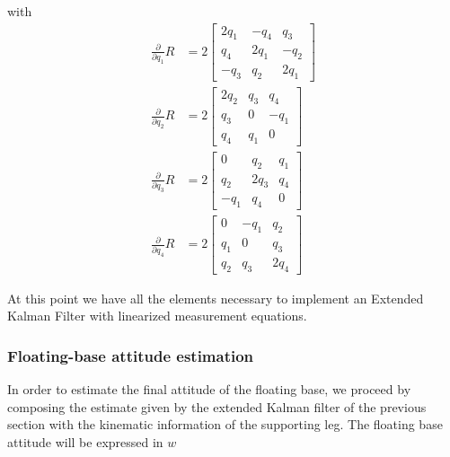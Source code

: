 \documentclass[12pt,a4paper,twoside]{article}
\begin{document}
  with
  \begin{align}
   \frac{\partial}{\partial q_1} R &= 2\left[ \begin{array}{ccc}
                                               2q_1 & -q_4 &  q_3 \\
                                               q_4  & 2q_1 & -q_2 \\
                                               -q_3 & q_2  & 2q_1
                                              \end{array}\right] \\
   \frac{\partial}{\partial q_2} R &= 2\left[ \begin{array}{ccc}
                                               2q_2 & q_3 & q_4 \\
                                               q_3  & 0   & -q_1 \\
                                               q_4  & q_1 & 0
                                              \end{array}\right] \\
   \frac{\partial}{\partial q_3} R &= 2\left[ \begin{array}{ccc}
                                               0    & q_2  & q_1 \\
                                               q_2  & 2q_3 & q_4 \\
                                              -q_1  & q_4  & 0
                                              \end{array}\right] \\
   \frac{\partial}{\partial q_4} R &= 2\left[ \begin{array}{ccc}
                                               0    & -q_1  & q_2 \\
                                               q_1  &  0    & q_3 \\
                                               q_2  & q_3   & 2q_4
                                              \end{array}\right]
  \end{align}

  At this point we have all the elements necessary to implement an Extended Kalman Filter with linearized measurement equations.

\subsubsection{Floating-base attitude estimation}
In order to estimate the final attitude of the floating base, we proceed by composing the estimate given by the extended Kalman filter of the previous section with the kinematic information of the supporting leg. The floating base attitude will be expressed in $w$
\end{document}

